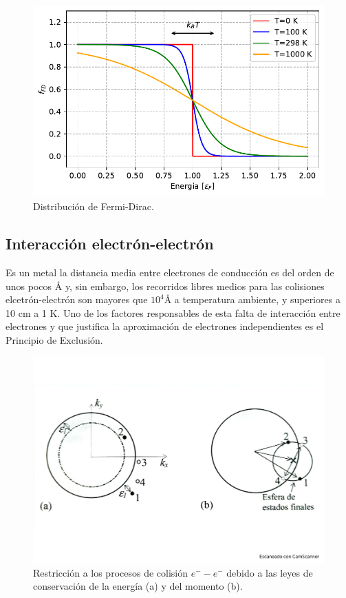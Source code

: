 \begin{figure}[h!] \centering
    \includegraphics[scale=0.75]{Cuerpo/Ch_06/06-Fermi-Dirac.pdf}
    \caption{Distribución de Fermi-Dirac.}
    \label{Fig:06-03}
\end{figure}    

\subsection{Interacción electrón-electrón}

Es un metal la distancia media entre electrones de conducción es del orden de unos pocos $\unit{\angstrom}$ y, sin embargo, los recorridos libres medios para las colisiones elcetrón-electrón son mayores que $10^4 \unit{\angstrom}$ a temperatura ambiente, y superiores a 10 cm a 1 K. Uno de los factores responsables de esta falta de interacción entre electrones y que justifica la aproximación de electrones independientes es el Principio de Exclusión.

\begin{figure}[h!] \centering
    \includegraphics[scale=0.35]{Cuerpo/Ch_06/Fotos libro 4.pdf}
    \caption{Restricción a los procesos de colisión $e^- - e^-$ debido a las leyes de conservación de la energía (a) y del momento (b).}
    \label{Fig:06-04}
\end{figure}  

